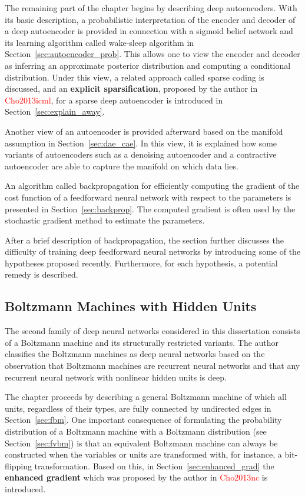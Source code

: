 \documentclass{now}
\newcommand{\alert}[1]{\textcolor{red}{#1}}
\newcommand{\citepub}[1]{\alert{#1}}
\begin{document}
The remaining part of the chapter begins by describing
deep autoencoders. With its basic description, a
probabilistic interpretation of the encoder and decoder of a
deep autoencoder is provided in connection with a
sigmoid belief network and its learning algorithm
called wake-sleep algorithm in
Section~\ref{sec:autoencoder_prob}. This allows one to view
the encoder and decoder as inferring an approximate
posterior distribution and computing a conditional
distribution. Under this view, a related approach called
sparse coding is discussed, and an
\textbf{explicit sparsification}, proposed by the
author in \citepub{Cho2013icml}, for a sparse deep
autoencoder is introduced in Section~\ref{sec:explain_away}.

Another view of an autoencoder is provided afterward based
on the manifold assumption in Section~\ref{sec:dae_cae}. In
this view, it is explained how some variants of autoencoders
such as a denoising autoencoder and a
contractive autoencoder are able to capture the
manifold on which data lies. 

An algorithm called backpropagation for efficiently computing the
gradient of the cost function of a feedforward neural network
with respect to the parameters is presented in
Section~\ref{sec:backprop}. The computed gradient is often used
by the stochastic gradient method to estimate the parameters.

After a brief description of backpropagation, the section further
discusses the difficulty of training deep feedforward neural
networks by introducing some of the hypotheses proposed recently.
Furthermore, for each hypothesis, a potential remedy is
described.

\subsection{Boltzmann Machines with Hidden Units}

The second family of deep neural networks considered in this
dissertation consists of a Boltzmann machine and its
structurally restricted variants. The author classifies the
Boltzmann machines as deep neural networks based on the
observation that Boltzmann machines are recurrent neural
networks and that any recurrent neural network with
nonlinear hidden units is deep.

The chapter proceeds by describing a general
Boltzmann machine of which all units, regardless of their
types, are fully connected by undirected edges in
Section~\ref{sec:fbm}. One important consequence of
formulating the probability distribution of a Boltzmann
machine with a Boltzmann distribution (see
Section~\ref{sec:fvbm}) is that an equivalent Boltzmann
machine can always be constructed when the variables or
units are transformed with, for instance, a bit-flipping
transformation. Based on this, in
Section~\ref{sec:enhanced_grad} the
\textbf{enhanced gradient} which was proposed by
the author in \citepub{Cho2013nc} is introduced.
\end{document}
